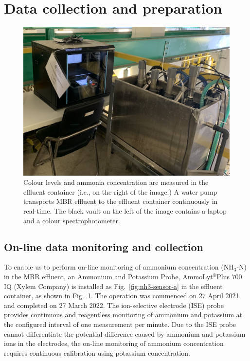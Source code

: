 \section{Data collection and preparation}

\begin{figure}[!ht]
    \centering
    \includegraphics[width=0.8\columnwidth]{imgs/instrument/sampling-tank.png}
    \caption{Colour levels and ammonia concentration are measured in the effluent container (i.e., on the right of the image.) A water pump transports MBR effluent to the effluent container continuously in real-time. The black vault on the left of the image contains a laptop and a colour spectrophotometer.} 
    \label{fig:sampling-tank}
 \end{figure}

\subsection{On-line data monitoring and collection}
To enable us to perform on-line monitoring of ammonium concentration (NH$_{3}$-N) in the MBR effluent, an Ammonium and Potassium Probe, AmmoLyt$^\circledR$Plus 700 IQ (Xylem Company) is installed as Fig.~\ref{fig:nh3-sensor-a} in the effluent container, as shown in Fig.~\ref{fig:sampling-tank}. The operation was commenced on 27 April 2021 and completed on 27 March 2022. The ion-selective electrode (ISE) probe provides continuous and reagentless monitoring of ammonium and potassium at the configured interval of one measurement per minute. Due to the ISE probe cannot differentiate the potential difference caused by ammonium and potassium ions in the electrodes, the on-line monitoring of ammonium concentration requires continuous calibration using potassium concentration.

